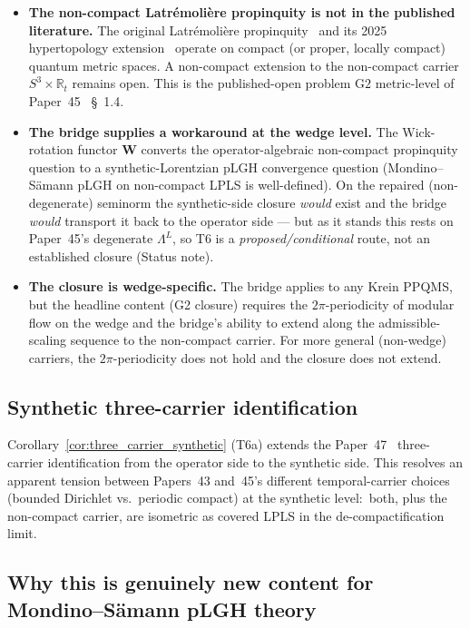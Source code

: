 \documentclass[11pt,a4paper]{article}
\theoremstyle{plain}
\theoremstyle{definition}
\newcommand{\sthree}{S^{3}}
\newcommand{\R}{\mathbb{R}}
\newcommand{\Lprop}{\Lambda^{L}}
\newcommand{\Wfun}{\mathbf{W}}
\begin{document}
\begin{itemize}
\item \textbf{The non-compact Latr\'emoli\`ere propinquity is not
in the published literature.} The original Latr\'emoli\`ere
propinquity~\cite{latremoliere2018, latremoliere_metric_st_2017} and
its 2025 hypertopology extension~\cite{latremoliere2025_hypertopology}
operate on compact (or proper, locally compact) quantum metric spaces.
A non-compact extension to the non-compact carrier $\sthree\times\R_{t}$
remains open. This is the published-open problem $\mathrm{G2}$
metric-level of Paper~45~\cite{paper45} \S~1.4.
\item \textbf{The bridge supplies a workaround at the wedge level.}
The Wick-rotation functor $\Wfun$ converts the operator-algebraic
non-compact propinquity question to a synthetic-Lorentzian pLGH
convergence question (Mondino--S\"amann pLGH on non-compact LPLS is
well-defined). On the repaired (non-degenerate) seminorm the
synthetic-side closure \emph{would} exist and the bridge \emph{would}
transport it back to the operator side --- but as it stands this rests
on Paper~45's degenerate $\Lprop$, so T6 is a \emph{proposed/conditional}
route, not an established closure (Status note).
\item \textbf{The closure is wedge-specific.} The bridge applies to
any Krein PPQMS, but the headline content (G2 closure) requires the
$2\pi$-periodicity of modular flow on the wedge and the bridge's
ability to extend along the admissible-scaling sequence to the
non-compact carrier. For more general (non-wedge) carriers, the
$2\pi$-periodicity does not hold and the closure does not extend.
\end{itemize}

\subsection{Synthetic three-carrier
identification}\label{sec:synthetic_three_carrier}

Corollary~\ref{cor:three_carrier_synthetic} (T6a) extends the
Paper~47~\cite{paper47} three-carrier identification from the
operator side to the synthetic side. This resolves an apparent
tension between Papers~43 and~45's different temporal-carrier choices
(bounded Dirichlet vs.\ periodic compact) at the synthetic level:\
both, plus the non-compact carrier, are isometric as covered LPLS in
the de-compactification limit.

\subsection{Why this is genuinely new content for Mondino--S\"amann
pLGH theory}\label{sec:why_new_for_ms}
\end{document}
